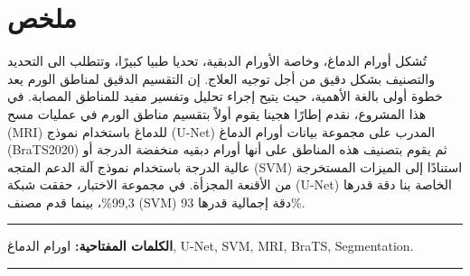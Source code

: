 \chapter*{\hfill  ملخص \hfill}

تُشكل أورام الدماغ، وخاصة الأورام الدبقية، تحديا طبيا كبيرًا، وتتطلب  الى التحديد والتصنيف بشكل دقيق من أجل توجيه العلاج. إن التقسيم الدقيق لمناطق الورم يعد خطوة أولى بالغة الأهمية، حيث يتيح إجراء تحليل وتفسير مفيد للمناطق المصابة. في هذا المشروع، نقدم إطارًا هجينا يقوم أولاً بتقسيم مناطق الورم في عمليات مسح \textenglish{(MRI)} للدماغ باستخدام نموذج \textenglish{(U-Net)} المدرب على مجموعة بيانات أورام الدماغ (\textenglish{BraTS2020}) ثم يقوم بتصنيف هذه المناطق على أنها أورام دبقيه منخفضة الدرجة أو عالية الدرجة باستخدام نموذج آلة الدعم المتجه \textenglish{(SVM)} استنادًا إلى الميزات المستخرجة من الأقنعة المجزأة. في مجموعة الاختبار، حققت شبكة \textenglish{(U-Net)} الخاصة بنا دقة قدرها \textenglish{99,3\%}، بينما قدم مصنف \textenglish{(SVM)} دقة إجمالية قدرها \textenglish{93\%}.

\noindent\rule{\textwidth}{0.2pt}
\textbf{الكلمات المفتاحية:} اورام الدماغ, \textenglish{U-Net}, \textenglish{SVM}, \textenglish{MRI}, \textenglish{BraTS}, \textenglish{Segmentation}.\\
\noindent\rule{\textwidth}{0.2pt}